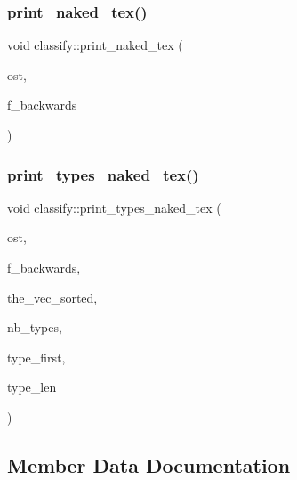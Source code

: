 \subsubsection{\texorpdfstring{print\+\_\+naked\+\_\+tex()}{print\_naked\_tex()}}
{\footnotesize\ttfamily void classify\+::print\+\_\+naked\+\_\+tex (\begin{DoxyParamCaption}\item[{ostream \&}]{ost,  }\item[{\mbox{\hyperlink{galois_8h_a09fddde158a3a20bd2dcadb609de11dc}{I\+NT}}}]{f\+\_\+backwards }\end{DoxyParamCaption})}

\mbox{\label{classclassify_a36a3de15470d458d85e524ef94e8a826}} 
\subsubsection{\texorpdfstring{print\+\_\+types\+\_\+naked\+\_\+tex()}{print\_types\_naked\_tex()}}
{\footnotesize\ttfamily void classify\+::print\+\_\+types\+\_\+naked\+\_\+tex (\begin{DoxyParamCaption}\item[{ostream \&}]{ost,  }\item[{\mbox{\hyperlink{galois_8h_a09fddde158a3a20bd2dcadb609de11dc}{I\+NT}}}]{f\+\_\+backwards,  }\item[{\mbox{\hyperlink{galois_8h_a09fddde158a3a20bd2dcadb609de11dc}{I\+NT}} $\ast$}]{the\+\_\+vec\+\_\+sorted,  }\item[{\mbox{\hyperlink{galois_8h_a09fddde158a3a20bd2dcadb609de11dc}{I\+NT}}}]{nb\+\_\+types,  }\item[{\mbox{\hyperlink{galois_8h_a09fddde158a3a20bd2dcadb609de11dc}{I\+NT}} $\ast$}]{type\+\_\+first,  }\item[{\mbox{\hyperlink{galois_8h_a09fddde158a3a20bd2dcadb609de11dc}{I\+NT}} $\ast$}]{type\+\_\+len }\end{DoxyParamCaption})}



\subsection{Member Data Documentation}
\mbox{\label{classclassify_a172d9e728ccc4dfae010580064f67d8a}} 
